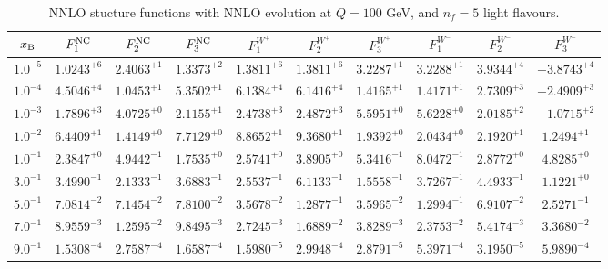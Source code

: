 \begin{table}[h]
\begin{adjustbox}{width=\textwidth}
\begin{tabular}{|c||c|c|c|c|c|c|c|c|c|}
\hline
$x_{\rm B}$ & $F_1^{\rm NC}$ & $F_2^{\rm NC}$ & $F_3^{\rm NC}$ & $F_1^{W^+}$ & $F_2^{W^+}$ & $F_3^{W^+}$ & $F_1^{W^-}$ & $F_2^{W^-}$ & $F_3^{W^-}$ \\
\hline
$ 1.0^{-5}$ & $ 1.0243^{+6}$ & $ 2.4063^{+1}$ & $ 1.3373^{+2}$ & $ 1.3811^{+6}$ & $ 1.3811^{+6}$ & $ 3.2287^{+1}$ & $ 3.2288^{+1}$ & $ 3.9344^{+4}$ & $-3.8743^{+4}$ \\
$ 1.0^{-4}$ & $ 4.5046^{+4}$ & $ 1.0453^{+1}$ & $ 5.3502^{+1}$ & $ 6.1384^{+4}$ & $ 6.1416^{+4}$ & $ 1.4165^{+1}$ & $ 1.4171^{+1}$ & $ 2.7309^{+3}$ & $-2.4909^{+3}$ \\
$ 1.0^{-3}$ & $ 1.7896^{+3}$ & $ 4.0725^{+0}$ & $ 2.1155^{+1}$ & $ 2.4738^{+3}$ & $ 2.4872^{+3}$ & $ 5.5951^{+0}$ & $ 5.6228^{+0}$ & $ 2.0185^{+2}$ & $-1.0715^{+2}$ \\
$ 1.0^{-2}$ & $ 6.4409^{+1}$ & $ 1.4149^{+0}$ & $ 7.7129^{+0}$ & $ 8.8652^{+1}$ & $ 9.3680^{+1}$ & $ 1.9392^{+0}$ & $ 2.0434^{+0}$ & $ 2.1920^{+1}$ & $ 1.2494^{+1}$ \\
$ 1.0^{-1}$ & $ 2.3847^{+0}$ & $ 4.9442^{-1}$ & $ 1.7535^{+0}$ & $ 2.5741^{+0}$ & $ 3.8905^{+0}$ & $ 5.3416^{-1}$ & $ 8.0472^{-1}$ & $ 2.8772^{+0}$ & $ 4.8285^{+0}$ \\
$ 3.0^{-1}$ & $ 3.4990^{-1}$ & $ 2.1333^{-1}$ & $ 3.6883^{-1}$ & $ 2.5537^{-1}$ & $ 6.1133^{-1}$ & $ 1.5558^{-1}$ & $ 3.7267^{-1}$ & $ 4.4933^{-1}$ & $ 1.1221^{+0}$ \\
$ 5.0^{-1}$ & $ 7.0814^{-2}$ & $ 7.1454^{-2}$ & $ 7.8100^{-2}$ & $ 3.5678^{-2}$ & $ 1.2877^{-1}$ & $ 3.5965^{-2}$ & $ 1.2994^{-1}$ & $ 6.9107^{-2}$ & $ 2.5271^{-1}$ \\
$ 7.0^{-1}$ & $ 8.9559^{-3}$ & $ 1.2595^{-2}$ & $ 9.8495^{-3}$ & $ 2.7245^{-3}$ & $ 1.6889^{-2}$ & $ 3.8289^{-3}$ & $ 2.3753^{-2}$ & $ 5.4174^{-3}$ & $ 3.3680^{-2}$ \\
$ 9.0^{-1}$ & $ 1.5308^{-4}$ & $ 2.7587^{-4}$ & $ 1.6587^{-4}$ & $ 1.5980^{-5}$ & $ 2.9948^{-4}$ & $ 2.8791^{-5}$ & $ 5.3971^{-4}$ & $ 3.1950^{-5}$ & $ 5.9890^{-4}$ \\
\hline
\end{tabular}
\end{adjustbox}\caption{NNLO stucture functions with NNLO evolution at $Q = 100$ GeV, and $n_f=5$ light flavours.}
\label{tab:N2LO-Q100}
\end{table}


